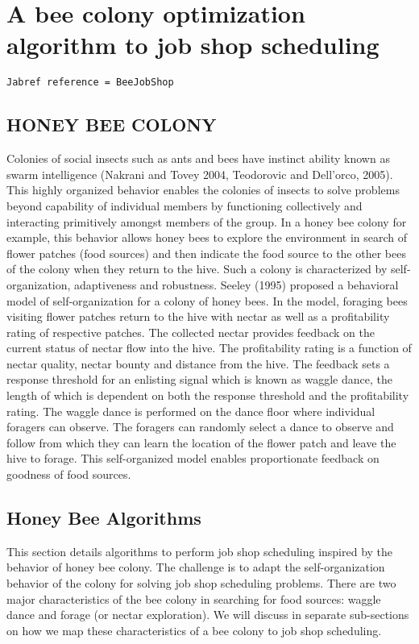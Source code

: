 \documentclass[pdftex,11pt]{article}
\begin{document}
\section{A bee colony optimization algorithm to job shop scheduling}
\begin{verbatim}
Jabref reference = BeeJobShop
\end{verbatim}
\subsection{HONEY BEE COLONY}
Colonies of social insects such as ants and bees have instinct ability known as swarm intelligence (Nakrani and Tovey 2004, Teodorovic and Dell'orco, 2005). This highly organized behavior enables the colonies of insects to solve problems beyond capability of individual members by functioning collectively and interacting primitively amongst members of the group. In a honey bee colony for example, this behavior allows honey bees to explore the environment in search of flower patches (food sources) and then indicate the food source to the other bees of the colony when they return to the hive. Such a colony is characterized by self-organization, adaptiveness and robustness. Seeley (1995) proposed a behavioral model of self-organization for a colony of honey bees. In the model, foraging bees visiting flower patches return to the hive with nectar as well as a profitability rating of respective patches. The collected nectar provides feedback on the current status of nectar flow into the hive. The profitability rating is a function of nectar quality, nectar bounty and distance from the hive. The feedback sets a response threshold for an enlisting signal which is known as waggle dance, the length of which is dependent on both the response threshold and the profitability rating. The waggle dance is performed on the dance floor where individual foragers can observe. The foragers can randomly select a dance to observe and follow from which they can learn the location of the flower patch and leave the hive to forage. This self-organized model enables proportionate feedback on goodness of food sources.
\subsection{Honey Bee Algorithms}
This section details algorithms to perform job shop scheduling inspired by the behavior of honey bee colony. The challenge is to adapt the self-organization behavior of the colony for solving job shop scheduling problems. There are two major characteristics of the bee colony in searching for food sources: waggle dance and forage (or nectar exploration). We will discuss in separate sub-sections on how we map these characteristics of a bee colony to job shop scheduling.
\end{document}
